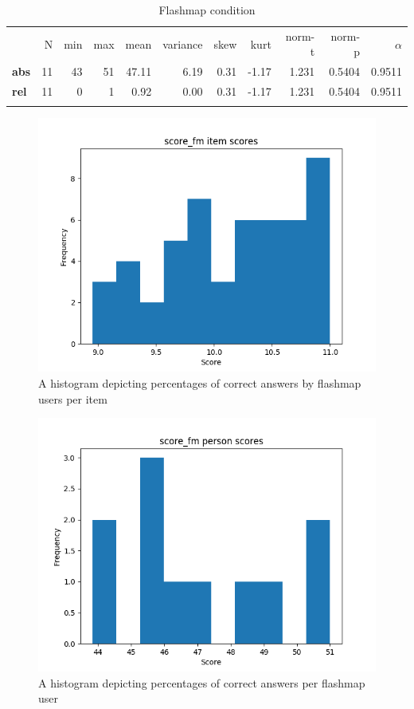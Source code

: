 \begin{longtable}[c]{@{}lrrrrrrrrrr@{}}
\caption{Flashmap condition}
\endfirsthead
\toprule\addlinespace
& N & min & max & mean & variance & skew & kurt & norm-t &
norm-p & $\alpha$
\\\addlinespace
\midrule
\textbf{abs} & 11 & 43 & 51 & 47.11 & 6.19 & 0.31 & -1.17 & 1.231 &
0.5404 & 0.9511
\\\addlinespace
\textbf{rel} & 11 & 0 & 1 & 0.92 & 0.00 & 0.31 & -1.17 & 1.231 & 0.5404
& 0.9511
\\\addlinespace
\bottomrule
    \label{tab:score_fm}
\end{longtable}

\begin{figure}
    \centering
    \includegraphics[width=.7\textwidth]{img/score_fm_diff.png}
    \caption{A histogram depicting percentages of correct answers by flashmap users per item}
    \label{fig:score_fm_diff}
\end{figure}
\begin{figure}
    \centering
    \includegraphics[width=.7\textwidth]{img/score_fm_abil.png}
    \caption{A histogram depicting percentages of correct answers per flashmap user}
    \label{fig:score_fm_abil}
\end{figure}

